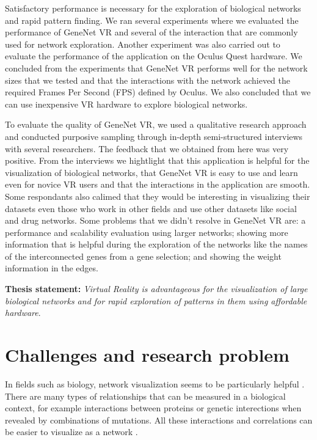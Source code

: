 Satisfactory performance is necessary for the exploration of biological networks and rapid pattern finding. We ran several experiments where we evaluated the performance of GeneNet VR and several of the interaction that are commonly used for network exploration. Another experiment was also carried out to evaluate the performance of the application on the Oculus Quest hardware. We concluded from the experiments that GeneNet VR performs well for the network sizes that we tested and that the interactions with the network achieved the required Frames Per Second (FPS) defined by Oculus. We also concluded that we can use inexpensive VR hardware to explore biological networks.

To evaluate the quality of GeneNet VR, we used a qualitative research approach and conducted purposive sampling through in-depth semi-structured interviews with several researchers. The feedback that we obtained from here was very positive. From the interviews we hightlight that this application is helpful for the visualization of biological networks, that GeneNet VR is easy to use and learn even for novice VR users and that the interactions in the application are smooth. Some respondants also calimed that they would be interesting in visualizing their datasets even those who work in other fields and use other datasets like social and drug networks. Some problems that we didn’t resolve in GeneNet VR are: a performance and scalability evaluation using larger networks; showing more information that is helpful during the exploration of the networks like the names of the interconnected genes from a gene selection; and showing the weight information in the edges.

\textbf{Thesis statement: } \emph{Virtual Reality is advantageous for the visualization of large biological networks and for rapid exploration of patterns in them using affordable hardware}.

\section{Challenges and research problem}

In fields such as biology, network visualization seems to be particularly helpful \cite{pujana_network_modeling} \cite{fraser_view_function}. There are many types of relationships that can be measured in a biological context, for example interactions between proteins or genetic interections when revealed by combinations of mutations. All these interactions and correlations can be easier to visualize as a network \cite{merico_visualization}.

